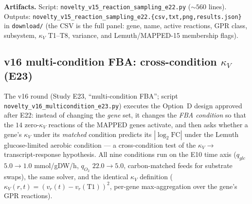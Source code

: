 \documentclass[11pt,a4paper]{article}
\theoremstyle{plain}
\theoremstyle{definition}
\theoremstyle{remark}
\begin{document}
\textbf{Artifacts.} Script:
\texttt{novelty\_v15\_reaction\_sampling\_e22.py} ($\sim$$560$ lines).
Outputs:
\texttt{novelty\_v15\_reaction\_sampling\_e22.\{csv,txt,png,results.json\}}
in \texttt{download/} (the CSV is the full panel: gene, name, active
reactions, GPR class, subsystem, $\kappa_V$ T1--T8, variance, and
Lemuth/MAPPED-15 membership flags).

\subsection{v16 multi-condition FBA: cross-condition $\kappa_V$
(E23)}\label{sec:novelty-v16}

The v16 round (Study E23, ``multi-condition FBA''; script
\texttt{novelty\_v16\_multicondition\_e23.py}) executes the Option~D
design approved after E22: instead of changing the \emph{gene} set,
it changes the \emph{FBA condition} so that the $14$ zero-$\kappa_V$
reactions of the MAPPED genes activate, and then asks whether a
gene's $\kappa_V$ under its \emph{matched} condition predicts its
$|\log_2\mathrm{FC}|$ under the Lemuth glucose-limited aerobic
condition --- a cross-condition test of the
$\kappa_V \to$ transcript-response hypothesis. All nine conditions
run on the E10 time axis ($q_{glc}$ $5.0 \to 1.0$ mmol/gDW/h,
$q_{O_2}$ $22.0 \to 5.0$, carbon-matched feeds for substrate swaps),
the same solver, and the identical $\kappa_V$ definition
($\kappa_V(r,t) = (v_r(t) - v_r(\mathrm{T1}))^2$, per-gene
max-aggregation over the gene's GPR reactions).
\end{document}
